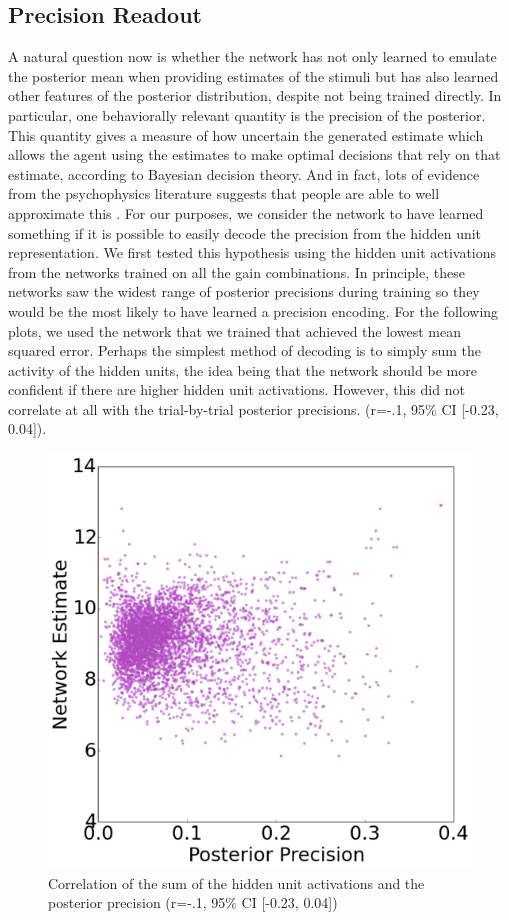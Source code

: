 \documentclass{article} %
\begin{document}
\subsection{Precision Readout}
A natural question now is whether the network has not only learned to emulate the posterior mean when providing estimates of the stimuli but has also learned other features of the posterior distribution, despite not being trained directly. In particular, one behaviorally relevant quantity is the precision of the posterior. This quantity gives a measure of how uncertain the generated estimate which allows the agent using the estimates to make optimal decisions that rely on that estimate, according to Bayesian decision theory. And in fact, lots of evidence from the psychophysics literature suggests that people are able to well approximate this \cite{Qamar10122013}. For our purposes, we consider the network to have learned something if it is possible to easily decode the precision from the hidden unit representation.  We first tested this hypothesis using the hidden unit activations from the networks trained on all the gain combinations. In principle, these networks saw the widest range of posterior precisions during training so they would be the most likely to have learned a precision encoding. For the following plots, we used the network that we trained that achieved the lowest mean squared error. Perhaps the simplest method of decoding is to simply sum the activity of the hidden units, the idea being that the network should be more confident if there are higher hidden unit activations. However, this did not correlate at all with the trial-by-trial posterior precisions.  (r=-.1, 95\% CI [-0.23, 0.04]). 
\begin{figure}[h]
\centering
\includegraphics[width = .5\textwidth]{Sum_Precisions.png}
\caption{Correlation of the sum of the hidden unit activations and the posterior precision (r=-.1, 95\% CI [-0.23, 0.04])}
\end{figure}
\end{document}
